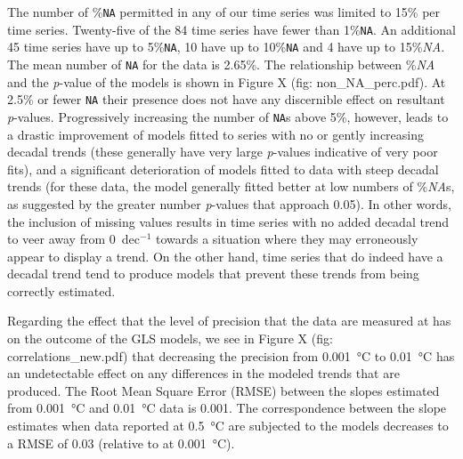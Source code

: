 \documentclass{ametsoc}
\begin{document}
The number of \%\texttt{NA} permitted in any of our time series was limited to 15\% per time series. Twenty-five of the 84 time series have fewer than 1\%\texttt{NA}. An additional 45 time series have up to 5\%\texttt{NA}, 10 have up to 10\%\texttt{NA} and 4 have up to 15\%\emph{NA}. The mean number of \texttt{NA} for the data is 2.65\%. The relationship between \%\emph{NA} and the \emph{p}-value of the models is shown in Figure X (fig: non_NA_perc.pdf). At 2.5\% or fewer \texttt{NA} their presence does not have any discernible effect on resultant \emph{p}-values. Progressively increasing the number of \texttt{NA}s above 5\%, however, leads to a drastic improvement of models fitted to series with no or gently increasing decadal trends (these generally have very large \emph{p}-values indicative of very poor fits), and a significant deterioration of models fitted to data with steep decadal trends (for these data, the model generally fitted better at low numbers of \%\emph{NA}s, as suggested by the greater number \emph{p}-values that approach 0.05). In other words, the inclusion of missing values results in time series with no added decadal trend to veer away from \si{0}{\degreeCelsius}~dec$^{-1}$ towards a situation where they may erroneously appear to display a trend. On the other hand, time series that do indeed have a decadal trend tend to produce models that prevent these trends from being correctly estimated.

Regarding the effect that the level of precision that the data are measured at has on the outcome of the GLS models, we see in Figure X (fig: correlations_new.pdf) that decreasing the precision from \SI{0.001}{\degreeCelsius} to \SI{0.01}{\degreeCelsius} has an undetectable effect on any differences in the modeled trends that are produced. The Root Mean Square Error (RMSE) between the slopes estimated from \SI{0.001}{\degreeCelsius} and \SI{0.01}{\degreeCelsius} data is 0.001. The correspondence between the slope estimates when data reported at \SI{0.5}{\degreeCelsius} are subjected to the models decreases to a RMSE of 0.03 (relative to at \SI{0.001}{\degreeCelsius}).
\end{document}
